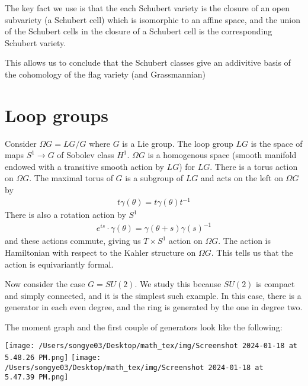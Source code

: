 \documentclass[12pt]{article}
\begin{document}
The key fact we use is that the each Schubert variety is the closure of an open subvariety (a Schubert cell) which is
isomorphic to an affine space, and the union of the Schubert cells in the closure of a Schubert cell is the corresponding Schubert variety.

\hfill

This allows us to conclude that the Schubert classes give an addivitive basis of the cohomology of the flag variety (and Grassmannian)
\section{Loop groups}

Consider $\Omega G = LG/G$ where $G$ is a Lie group. The loop group $LG$ is the space of maps $S^1\to G$ of Sobolev class $H^1$.
$\Omega G$ is a homogenous space (smooth manifold endowed with a transitive smooth action by $LG$) for $LG$.
There is a torus action on $\Omega G$. The maximal torus of $G$ is a subgroup of $LG$ and acts on the left on $\Omega G$ by \begin{align*}
    t\gamma(\theta) = t\gamma(\theta)t^{-1}
\end{align*}
There is also a rotation action by $S^1$ \begin{align*}
    e^{is}\cdot \gamma(\theta) = \gamma(\theta + s)\gamma(s)^{-1}
\end{align*} and these actions commute, giving us $T\times S^1$ action on $\Omega G$.
The action is Hamiltonian with respect to the Kahler structure on $\Omega G$. This tells us that the action is equivariantly formal.

\hfill

Now consider the case $G = SU(2)$. We study this because $SU(2)$ is compact and simply connected, and it is the simplest such example.
In this case, there is a generator in each even degree, and the ring is generated by the one in degree two.

\hfill

The moment graph and the first couple of generators look like the following: 
\begin{center}
    \texttt{[image: /Users/songye03/Desktop/math\_tex/img/Screenshot 2024-01-18 at 5.48.26 PM.png]}
    \texttt{[image: /Users/songye03/Desktop/math\_tex/img/Screenshot 2024-01-18 at 5.47.39 PM.png]}
\end{center}

\end{document}
